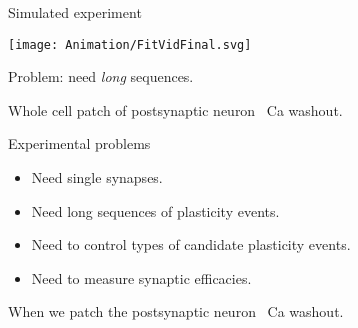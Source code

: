 \documentclass[final]{beamer}%
\begin{document}
\begin{frame}{Simulated experiment}
%
 \begin{center}
   \texttt{[image: Animation/FitVidFinal.svg]}
 \end{center}
 Problem: need \emph{long} sequences.

 Whole cell patch of postsynaptic neuron \lto\ Ca washout.
%
%
%
%
%

%
\end{frame}



\begin{frame}{Experimental problems}
%
 \begin{itemize}
   \item Need single synapses.
   \item Need long sequences of plasticity events.
   \item Need to control types of candidate plasticity events.
   \item Need to measure synaptic efficacies.
 \end{itemize}

 \vp When we patch the postsynaptic neuron \lto\ Ca washout.
%
\end{frame}
\end{document}
